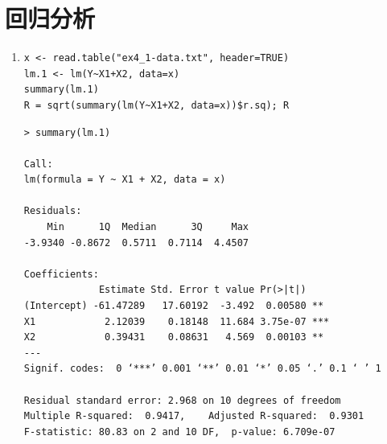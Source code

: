 \section{回归分析}
    \begin{enumerate}
        \item
        \code
\begin{lstlisting}
x <- read.table("ex4_1-data.txt", header=TRUE)
lm.1 <- lm(Y~X1+X2, data=x)
summary(lm.1)
R = sqrt(summary(lm(Y~X1+X2, data=x))$r.sq); R
\end{lstlisting}
        \out
\begin{lstlisting}
> summary(lm.1)

Call:
lm(formula = Y ~ X1 + X2, data = x)

Residuals:
    Min      1Q  Median      3Q     Max 
-3.9340 -0.8672  0.5711  0.7114  4.4507 

Coefficients:
             Estimate Std. Error t value Pr(>|t|)    
(Intercept) -61.47289   17.60192  -3.492  0.00580 ** 
X1            2.12039    0.18148  11.684 3.75e-07 ***
X2            0.39431    0.08631   4.569  0.00103 ** 
---
Signif. codes:  0 ‘***’ 0.001 ‘**’ 0.01 ‘*’ 0.05 ‘.’ 0.1 ‘ ’ 1

Residual standard error: 2.968 on 10 degrees of freedom
Multiple R-squared:  0.9417,	Adjusted R-squared:  0.9301 
F-statistic: 80.83 on 2 and 10 DF,  p-value: 6.709e-07


\end{lstlisting}
\end{enumerate}
